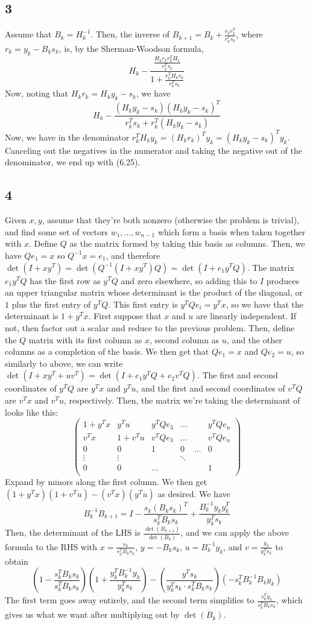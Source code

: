 \documentclass{article}
\newcommand{\openm}{\begin{pmatrix}}
\newcommand{\closem}{\end{pmatrix}}
\begin{document}
\subsection*{3}
Assume that $B_k=H_k^{-1}$. Then, the inverse of $B_{k+1}=B_k+\frac{r_kr_k^T}{r_k^Ts_k}$, where $r_k=y_k-B_ks_k$, is, by the Sherman-Woodson formula, 
\[H_k-\frac{\frac{H_kr_kr_k^TH_k}{r_k^Ts_k}}{1+\frac{r_k^TH_kr_k}{r_k^Ts_k}}\]
Now, noting that $H_kr_k=H_ky_k-s_k$, we have
\[H_k-\frac{(H_ky_k-s_k)(H_ky_k-s_k)^T}{r_k^Ts_k+r_k^T(H_ky_k-s_k)}\]
Now, we have in the denominator $r_k^TH_ky_k=(H_kr_k)^Ty_k=(H_ky_k-s_k)^Ty_k$. Canceling out the negatives in the numerator and taking the negative out of the denominator, we end up with (6.25).
\subsection*{4}
Given $x, y$, assume that they're both nonzero (otherwise the problem is trivial), and find some set of vectors $w_1,\ldots,w_{n-1}$ which form a basis when taken together with $x$. Define $Q$ as the matrix formed by taking this basis as columns. Then, we have $Qe_1=x$ so $Q^{-1}x=e_1$, and therefore $\det(I+xy^T)=\det(Q^{-1}(I+xy^T)Q)=\det(I+e_1y^TQ)$. The matrix $e_1y^TQ$ has the first row as $y^TQ$ and zero elsewhere, so adding this to $I$ produces an upper triangular matrix whose determinant is the product of the diagonal, or $1$ plus the first entry of $y^TQ$. This first entry is $y^TQe_i=y^Tx$, so we have that the determinant is $1+y^Tx$.
First suppose that $x$ and $u$ are linearly independent. If not, then factor out a scalar and reduce to the previous problem. Then, define the $Q$ matrix with its first column as $x$, second column as $u$, and the other columns as a completion of the basis. We then get that $Qe_1=x$ and $Qe_2=u$, so similarly to above, we can write $\det(I+xy^T+uv^T)=\det(I+e_1y^TQ+e_2v^TQ)$. The first and second coordinates of $y^TQ$ are $y^Tx$ and $y^Tu$, and the first and second coordinates of $v^TQ$ are $v^Tx$ and $v^Tu$, respectively. Then, the matrix we're taking the determinant of looks like this:
\[\openm 1+y^Tx&y^Tu&y^TQe_3&\hdots&&y^TQe_n\\
v^Tx&1+v^Tu&v^TQe_3&\hdots&&v^TQe_n\\
0&0&1&0&\hdots&0\\
\vdots&\vdots&&\ddots\\
0&0&\hdots&&&1\\
\closem\]
Expand by minors along the first column. We then get $(1+y^Tx)(1+v^Tu)-(v^Tx)(y^Tu)$ as desired.
We have 
\[B_k^{-1}B_{k+1}=I-\frac{s_k(B_ks_k)^T}{s_k^TB_ks_k}+\frac{B_k^{-1}y_ky_k^T}{y_k^Ts_k}\]
Then, the determinant of the LHS is $\frac{\det(B_{k+1})}{\det(B_k)}$, and we can apply the above formula to the RHS with $x=\frac{s_k}{s_k^TB_ks_k}$, $y=-B_ks_k$, $u=B_k^{-1}y_k$, and $v=\frac{y_k}{y_k^Ts_k}$ to obtain
\[\left(1-\frac{s_k^TB_ks_k}{s_k^TB_ks_k}\right)\left(1+\frac{y_k^TB_k^{-1}y_k}{y_k^Ts_k}\right)-\left(\frac{y^Ts_k}{y_k^Ts_k\cdot s_k^TB_ks_k}\right)\left(-s_k^TB_k^{-1}B_ky_k\right)
\]
The first term goes away entirely, and the second term simplifies to $\frac{s_k^Ty_k}{s_k^TB_ks_k}$, which gives us what we want after multiplying out by $\det(B_k)$.
\end{document}
